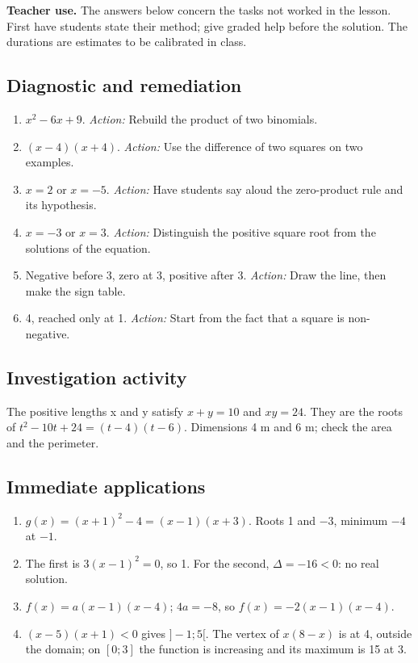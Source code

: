 \label{C02-CORR}
\textbf{Teacher use.} The answers below concern the tasks not worked in the lesson. First have students state their method; give graded help before the solution. The durations are estimates to be calibrated in class.
\subsection*{Diagnostic and remediation}
\begin{enumerate}
\item $x^2-6x+9$. \textit{Action:} Rebuild the product of two binomials.
\item $(x-4)(x+4)$. \textit{Action:} Use the difference of two squares on two examples.
\item $x=2$ or $x=-5$. \textit{Action:} Have students say aloud the zero-product rule and its hypothesis.
\item $x=-3$ or $x=3$. \textit{Action:} Distinguish the positive square root from the solutions of the equation.
\item Negative before 3, zero at 3, positive after 3. \textit{Action:} Draw the line, then make the sign table.
\item 4, reached only at 1. \textit{Action:} Start from the fact that a square is non-negative.
\end{enumerate}
\subsection*{Investigation activity}
The positive lengths x and y satisfy $x+y=10$ and $xy=24$. They are the roots of $t^2-10t+24=(t-4)(t-6)$. Dimensions 4 m and 6 m; check the area and the perimeter.
\subsection*{Immediate applications}
\begin{enumerate}
\item $g(x)=(x+1)^2-4=(x-1)(x+3)$. Roots 1 and $-3$, minimum $-4$ at $-1$.
\item The first is $3(x-1)^2=0$, so 1. For the second, $\Delta=-16<0$: no real solution.
\item $f(x)=a(x-1)(x-4)$; $4a=-8$, so $f(x)=-2(x-1)(x-4)$.
\item $(x-5)(x+1)<0$ gives $]-1;5[$. The vertex of $x(8-x)$ is at 4, outside the domain; on $[0;3]$ the function is increasing and its maximum is 15 at 3.
\end{enumerate}
